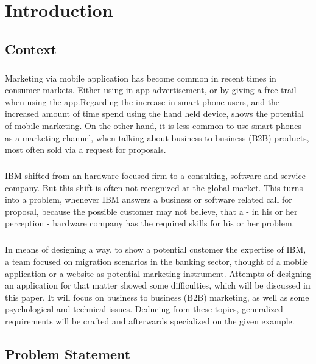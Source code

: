 \chapter{Introduction}
\section{Context}
\paragraph*{}
Marketing via mobile application has become common in recent times in consumer markets. Either using in app advertisement, or by giving a free trail when using the app.Regarding the increase in smart phone users, and the increased amount of time spend using the hand held device, shows the potential of mobile marketing. On the other hand, it is less common to use smart phones as a marketing channel, when talking about business to business (B2B) products, most often sold via a request for proposals.
\paragraph*{}
IBM shifted from an hardware focused firm to a consulting, software and service company. But this shift is often not recognized at the global market. This turns into a problem, whenever IBM answers a business or software related call for proposal, because the possible customer may not believe, that a - in his or her perception - hardware company has the required skills for his or her problem.
\paragraph*{}
In means of designing a way, to show a potential customer the expertise of IBM, a team focused on migration scenarios in the banking sector, thought of a mobile application or a website as potential marketing instrument. Attempts of designing an application for that matter showed some difficulties, which will be discussed in this paper. It will focus on business to business (B2B) marketing, as well as some psychological and technical issues. Deducing from these topics, generalized requirements will be crafted and afterwards specialized on the given example. 
\section{Problem Statement}